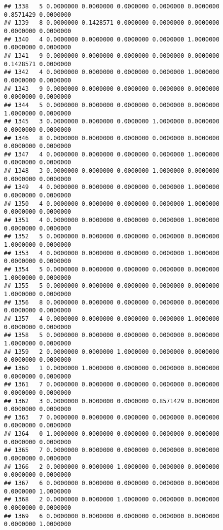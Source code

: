 \documentclass[
]{article}
\begin{document}
\begin{verbatim}
## 1338   5 0.0000000 0.0000000 0.0000000 0.0000000 0.0000000 0.8571429 0.0000000
## 1339   8 0.0000000 0.1428571 0.0000000 0.0000000 0.0000000 0.0000000 0.0000000
## 1340   4 0.0000000 0.0000000 0.0000000 0.0000000 1.0000000 0.0000000 0.0000000
## 1341   9 0.0000000 0.0000000 0.0000000 0.0000000 0.0000000 0.1428571 0.0000000
## 1342   4 0.0000000 0.0000000 0.0000000 0.0000000 1.0000000 0.0000000 0.0000000
## 1343   9 0.0000000 0.0000000 0.0000000 0.0000000 0.0000000 0.0000000 0.0000000
## 1344   5 0.0000000 0.0000000 0.0000000 0.0000000 0.0000000 1.0000000 0.0000000
## 1345   3 0.0000000 0.0000000 0.0000000 1.0000000 0.0000000 0.0000000 0.0000000
## 1346   8 0.0000000 0.0000000 0.0000000 0.0000000 0.0000000 0.0000000 0.0000000
## 1347   4 0.0000000 0.0000000 0.0000000 0.0000000 1.0000000 0.0000000 0.0000000
## 1348   3 0.0000000 0.0000000 0.0000000 1.0000000 0.0000000 0.0000000 0.0000000
## 1349   4 0.0000000 0.0000000 0.0000000 0.0000000 1.0000000 0.0000000 0.0000000
## 1350   4 0.0000000 0.0000000 0.0000000 0.0000000 1.0000000 0.0000000 0.0000000
## 1351   4 0.0000000 0.0000000 0.0000000 0.0000000 1.0000000 0.0000000 0.0000000
## 1352   5 0.0000000 0.0000000 0.0000000 0.0000000 0.0000000 1.0000000 0.0000000
## 1353   4 0.0000000 0.0000000 0.0000000 0.0000000 1.0000000 0.0000000 0.0000000
## 1354   5 0.0000000 0.0000000 0.0000000 0.0000000 0.0000000 1.0000000 0.0000000
## 1355   5 0.0000000 0.0000000 0.0000000 0.0000000 0.0000000 1.0000000 0.0000000
## 1356   8 0.0000000 0.0000000 0.0000000 0.0000000 0.0000000 0.0000000 0.0000000
## 1357   4 0.0000000 0.0000000 0.0000000 0.0000000 1.0000000 0.0000000 0.0000000
## 1358   5 0.0000000 0.0000000 0.0000000 0.0000000 0.0000000 1.0000000 0.0000000
## 1359   2 0.0000000 0.0000000 1.0000000 0.0000000 0.0000000 0.0000000 0.0000000
## 1360   1 0.0000000 1.0000000 0.0000000 0.0000000 0.0000000 0.0000000 0.0000000
## 1361   7 0.0000000 0.0000000 0.0000000 0.0000000 0.0000000 0.0000000 0.0000000
## 1362   3 0.0000000 0.0000000 0.0000000 0.8571429 0.0000000 0.0000000 0.0000000
## 1363   7 0.0000000 0.0000000 0.0000000 0.0000000 0.0000000 0.0000000 0.0000000
## 1364   0 1.0000000 0.0000000 0.0000000 0.0000000 0.0000000 0.0000000 0.0000000
## 1365   7 0.0000000 0.0000000 0.0000000 0.0000000 0.0000000 0.0000000 0.0000000
## 1366   2 0.0000000 0.0000000 1.0000000 0.0000000 0.0000000 0.0000000 0.0000000
## 1367   6 0.0000000 0.0000000 0.0000000 0.0000000 0.0000000 0.0000000 1.0000000
## 1368   2 0.0000000 0.0000000 1.0000000 0.0000000 0.0000000 0.0000000 0.0000000
## 1369   6 0.0000000 0.0000000 0.0000000 0.0000000 0.0000000 0.0000000 1.0000000

\end{verbatim}
\end{document}
